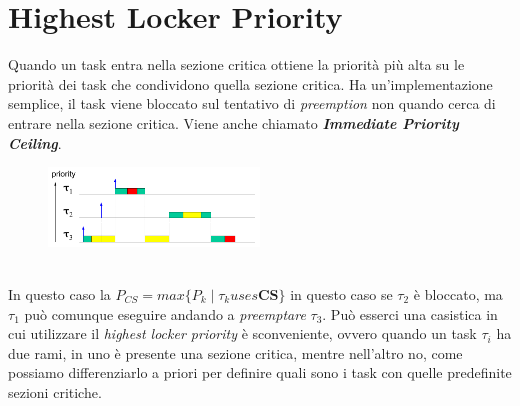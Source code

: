 \section{Highest Locker Priority}
Quando un task entra nella sezione critica ottiene la priorità più alta su le priorità dei task che condividono quella sezione critica. Ha un'implementazione semplice, il task viene bloccato sul tentativo di \textit{preemption} non quando cerca di entrare nella sezione critica. Viene anche chiamato \textbf{\textit{Immediate Priority Ceiling}}.
\begin{figure}[h]
    \centering
    \includegraphics[width=0.5\textwidth]{img/hlp}
\end{figure}
\\
In questo caso la $P_{CS} = max\{P_k \; | \; \tau_k uses \mathbf{ CS}\}$ in questo caso se $\tau_2$ è bloccato, ma $\tau_1$ può comunque eseguire andando a \textit{preemptare} $\tau_3$. Può esserci una casistica in cui utilizzare il \textit{highest locker priority} è sconveniente, ovvero quando un task $\tau_i$ ha due rami, in uno è presente una sezione critica, mentre nell'altro no, come possiamo differenziarlo a priori per definire quali sono i task con quelle predefinite sezioni critiche.

